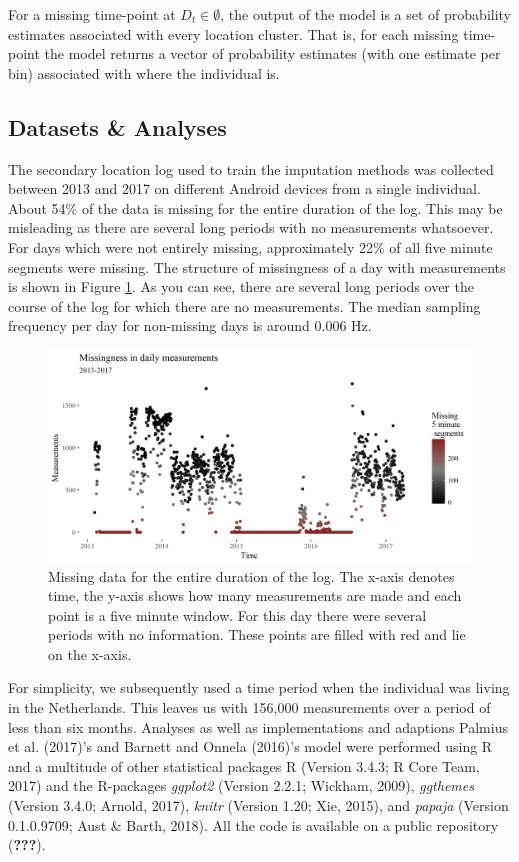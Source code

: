 \documentclass[man]{apa6}
\theoremstyle{definition}
\theoremstyle{definition}
\theoremstyle{definition}
\theoremstyle{remark}
\begin{document}
For a missing time-point at \(D_t \in \emptyset\), the output of the
model is a set of probability estimates associated with every location
cluster. That is, for each missing time-point the model returns a vector
of probability estimates (with one estimate per bin) associated with
where the individual is.

\subsection{Datasets \& Analyses}\label{datasets-analyses}

The secondary location log used to train the imputation methods was
collected between 2013 and 2017 on different Android devices from a
single individual. About 54\% of the data is missing for the entire
duration of the log. This may be misleading as there are several long
periods with no measurements whatsoever. For days which were not
entirely missing, approximately 22\% of all five minute segments were
missing. The structure of missingness of a day with measurements is
shown in Figure \ref{fig:measurementsPerDay}. As you can see, there are
several long periods over the course of the log for which there are no
measurements. The median sampling frequency per day for non-missing days
is around 0.006 Hz.

\begin{figure}
\includegraphics[width=1\linewidth]{img/missingdayBoaz5min} \caption{Missing data for the entire duration of the log. The x-axis denotes time, the y-axis shows how many measurements are made and each point is a five minute window. For this day there were several periods with no information. These points are filled with red and lie on the x-axis.}\label{fig:measurementsPerDay}
\end{figure}

For simplicity, we subsequently used a time period when the individual
was living in the Netherlands. This leaves us with 156,000 measurements
over a period of less than six months. Analyses as well as
implementations and adaptions Palmius et al. (2017)'s and Barnett and
Onnela (2016)'s model were performed using R and a multitude of other
statistical packages R (Version 3.4.3; R Core Team, 2017) and the
R-packages \emph{ggplot2} (Version 2.2.1; Wickham, 2009),
\emph{ggthemes} (Version 3.4.0; Arnold, 2017), \emph{knitr} (Version
1.20; Xie, 2015), and \emph{papaja} (Version 0.1.0.9709; Aust \& Barth,
2018). All the code is available on a public repository
({\textbf{???}}).
\end{document}
